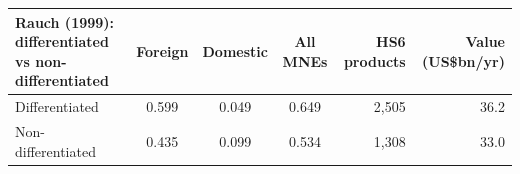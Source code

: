 \begin{tabular}{lcccrr}
\toprule
Rauch (1999): differentiated vs non-differentiated & Foreign & Domestic & All MNEs & HS6 products & Value (US\$bn/yr) \\
\midrule
Differentiated & 0.599 & 0.049 & 0.649 & 2,505 & 36.2 \\
Non-differentiated & 0.435 & 0.099 & 0.534 & 1,308 & 33.0 \\
\bottomrule
\end{tabular}
